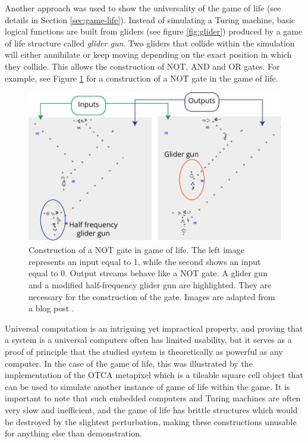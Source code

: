 Another approach was used to show the universality of the game of life (see
details in Section \ref{sec:game-life}). Instead of simulating a Turing machine,
basic logical functions are built from gliders (see figure \ref{fig:glider})
produced by a game of life structure called \emph{glider gun}. Two gliders that
collide within the simulation will either annihilate or keep moving depending on
the exact position in which they collide. This allows the construction of NOT, AND and
OR gates. For example, see Figure \ref{fig:gol_not_gate} for a construction of a
NOT gate in the game of life.

\begin{figure}[htbp]
  \centering
  \includegraphics[width=.8\linewidth]{figures/gol_not_gate}
  \caption{Construction of a NOT gate in game of life. The left image represents
    an input equal to 1, while the second shows an input equal to 0. Output
    streams behave like a NOT gate. A glider gun and a modified half-frequency
    glider gun are highlighted. They are necessary for the construction of the
    gate. Images are adapted from a blog post
    \parencite{carliniDigitalLogicGates2020}.}
  \label{fig:gol_not_gate}
\end{figure}

Universal computation is an intriguing yet impractical property, and proving
that a system is a universal computers often has limited usability, but it
serves as a proof of principle that the studied system is theoretically as
powerful as any computer. In the case of the game of life, this was illustrated
by the implementation of the OTCA metapixel which is a tileable square cell
object that can be used to simulate another instance of game of life within the
game. It is important to note that such embedded computers and Turing machines
are often very slow and inefficient, and the game of life has brittle structures
which would be destroyed by the slightest perturbation, making these
constructions unusable for anything else than demonstration.

